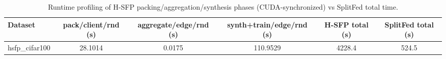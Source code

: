 \begin{table}[t]
\centering
\caption{Runtime profiling of H-SFP packing/aggregation/synthesis phases (CUDA-synchronized) vs SplitFed total time.}
\label{tab:profiling}
\begin{tabular}{lccccc}
\toprule
Dataset & pack/client/rnd (s) & aggregate/edge/rnd (s) & synth+train/edge/rnd (s) & H-SFP total (s) & SplitFed total (s) \\
\midrule
hsfp_cifar100 & 28.1014 & 0.0175 & 110.9529 & 4228.4 & 524.5 \\
\bottomrule
\end{tabular}
\end{table}
